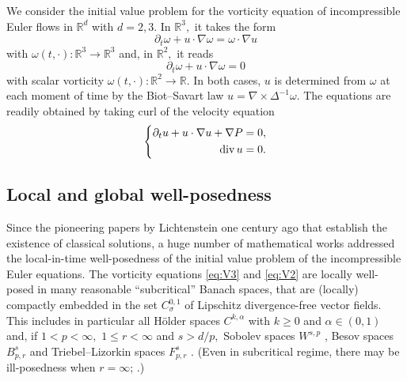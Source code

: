 \documentclass[11pt]{amsart}
\newcommand{\R}{{\mathbb R}}
\newcommand{\T}{{\mathbb T}}
\numberwithin{equation}{section}
\def\d{\partial}
\newcommand{\nb}{\nabla}
\def\div{\mathop{\rm div}\nolimits}
\newcommand{\omg}{\omega}
\def\rd{\partial}
\def\bbR{\mathbb{R}}
\begin{document}
We consider the initial value problem for the vorticity equation of incompressible Euler flows in $\bbR^d$ with $d = 2, 3.$
In $\bbR^3,$
it takes the form \begin{equation}\label{eq:V3}
		\rd_t \omg + u\cdot \nb \omg = \omg \cdot \nb u 
\end{equation}  with $\omg(t,\cdot): \bbR^3\to\bbR^3$ and, in $\bbR^2,$ it reads
 \begin{equation}\label{eq:V2}\d_t\omega +u\cdot\nabla \omega=0\end{equation}
 with scalar vorticity $\omg(t,\cdot): \bbR^{2} \to \bbR$.
\medbreak
 In both cases, $u$ is determined from $\omg$ at each moment of time by the Biot--Savart law $u = \nb\times\Delta^{-1}\omg. $ The equations are readily obtained by taking curl of the velocity equation \begin{equation} \label{eq:euler}
	\left\{	\begin{aligned} 		\d_tu+ u\cdot\nabla u+\nabla P=0 , & \\
	\div u=0.&
		\end{aligned}
	\right. \end{equation} 



\subsection{Local and global well-posedness}

Since the pioneering papers by Lichtenstein  \cite{lichtenstein} one century ago that establish the existence of classical solutions, 
a huge number of mathematical works  addressed  the  local-in-time  well-posedness  of the initial value problem of the incompressible Euler equations. The vorticity equations \eqref{eq:V3} and \eqref{eq:V2} are locally well-posed in many reasonable ``subcritical'' Banach spaces, that are (locally) compactly embedded in the set $C^{0,1}_\sigma$ of  Lipschitz divergence-free vector fields. This includes in particular all   H\"older spaces  $C^{k,\alpha}$ with $k\geq 0$ and $\alpha\in(0,1)$ \cite{G,Ch} and, 
  if $1 < p < \infty,$ $1 \leq r < \infty$  and $s > d/p,$ Sobolev spaces $W^{s,p}$  \cite{KP1,KP2}, Besov spaces $B^s_{p,r}$ 
  \cite{C,Vishik,Vishik2,Zhou} and Triebel--Lizorkin spaces   $F^s_{p,r}$ \cite{CMZ}. (Even in subcritical regime, there may be ill-posedness when $r = \infty$; \cite{ChSh,JP,MY}.)
\end{document}
